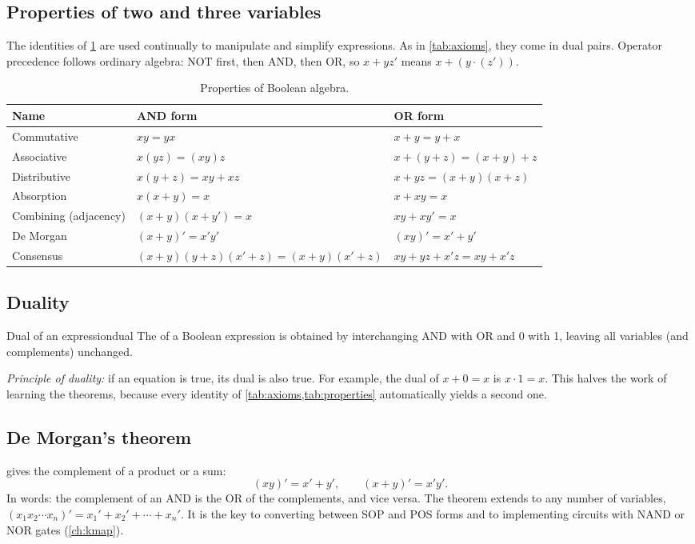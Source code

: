 \subsection{Properties of two and three variables}
The identities of \cref{tab:properties} are used continually to manipulate and simplify expressions. As in \cref{tab:axioms}, they come in dual pairs. Operator precedence follows ordinary algebra: NOT first, then AND, then OR, so $x + yz'$ means $x + (y\cdot(z'))$.

\begin{table}[htbp]
\centering
\caption{Properties of Boolean algebra.}
\label{tab:properties}
\renewcommand{\arraystretch}{1.25}
\begin{tabular}{@{}lll@{}}
\toprule
\textbf{Name} & \textbf{AND form} & \textbf{OR form}\\
\midrule
Commutative & $xy = yx$ & $x+y = y+x$\\
Associative & $x(yz) = (xy)z$ & $x+(y+z) = (x+y)+z$\\
Distributive & $x(y+z) = xy+xz$ & $x+yz = (x+y)(x+z)$\\
Absorption & $x(x+y) = x$ & $x+xy = x$\\
Combining (adjacency) & $(x+y)(x+y') = x$ & $xy+xy' = x$\\
De Morgan & $(x+y)' = x'y'$ & $(xy)' = x'+y'$\\
Consensus & $(x+y)(y+z)(x'+z) = (x+y)(x'+z)$ & $xy+yz+x'z = xy+x'z$\\
\bottomrule
\end{tabular}
\end{table}

\subsection{Duality}
\begin{definition}{Dual of an expression}{dual}
The  of a Boolean expression is obtained by interchanging AND with OR and 0 with 1, leaving all variables (and complements) unchanged.
\end{definition}
\emph{Principle of duality:} if an equation is true, its dual is also true. For example, the dual of $x+0=x$ is $x\cdot 1=x$. This halves the work of learning the theorems, because every identity of \cref{tab:axioms,tab:properties} automatically yields a second one.

\subsection{De Morgan's theorem}
 gives the complement of a product or a sum:
\begin{equation}
  (xy)' = x' + y', \qquad (x+y)' = x'y'.
  \label{eq:demorgan}
\end{equation}
In words: the complement of an AND is the OR of the complements, and vice versa. The theorem extends to any number of variables, $(x_1x_2\cdots x_n)' = x_1'+x_2'+\cdots+x_n'$. It is the key to converting between SOP and POS forms and to implementing circuits with NAND or NOR gates (\cref{ch:kmap}).

